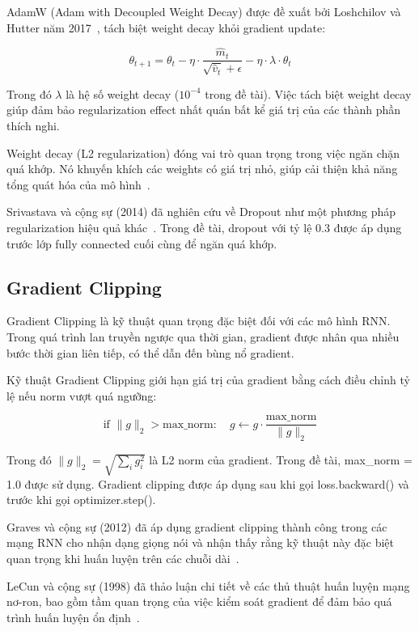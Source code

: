 \documentclass[../BTL.tex]{subfiles}
\begin{document}
AdamW (Adam with Decoupled Weight Decay) được đề xuất bởi Loshchilov và Hutter năm 2017~\cite{loshchilov2017adamw}, tách biệt weight decay khỏi gradient update:

\begin{equation}
    \theta_{t+1} = \theta_t - \eta \cdot \frac{\hat{m}_t}{\sqrt{\hat{v}_t} + \epsilon} - \eta \cdot \lambda \cdot \theta_t
\end{equation}

Trong đó $\lambda$ là hệ số weight decay ($10^{-4}$ trong đề tài). Việc tách biệt weight decay giúp đảm bảo regularization effect nhất quán bất kể giá trị của các thành phần thích nghi.

Weight decay (L2 regularization) đóng vai trò quan trọng trong việc ngăn chặn quá khớp. Nó khuyến khích các weights có giá trị nhỏ, giúp cải thiện khả năng tổng quát hóa của mô hình~\cite{goodfellow2016deep}.

Srivastava và cộng sự (2014) đã nghiên cứu về Dropout như một phương pháp regularization hiệu quả khác~\cite{srivastava2014dropout}. Trong đề tài, dropout với tỷ lệ 0.3 được áp dụng trước lớp fully connected cuối cùng để ngăn quá khớp.

\subsection{Gradient Clipping}
Gradient Clipping là kỹ thuật quan trọng đặc biệt đối với các mô hình RNN. Trong quá trình lan truyền ngược qua thời gian, gradient được nhân qua nhiều bước thời gian liên tiếp, có thể dẫn đến bùng nổ gradient.

Kỹ thuật Gradient Clipping giới hạn giá trị của gradient bằng cách điều chỉnh tỷ lệ nếu norm vượt quá ngưỡng:

\begin{equation}
    \text{if } \|g\|_2 > \text{max\_norm}: \quad g \leftarrow g \cdot \frac{\text{max\_norm}}{\|g\|_2}
\end{equation}

Trong đó $\|g\|_2 = \sqrt{\sum_i g_i^2}$ là L2 norm của gradient. Trong đề tài, max\_norm = 1.0 được sử dụng. Gradient clipping được áp dụng sau khi gọi loss.backward() và trước khi gọi optimizer.step().

Graves và cộng sự (2012) đã áp dụng gradient clipping thành công trong các mạng RNN cho nhận dạng giọng nói và nhận thấy rằng kỹ thuật này đặc biệt quan trọng khi huấn luyện trên các chuỗi dài~\cite{graves2012supervised}.

LeCun và cộng sự (1998) đã thảo luận chi tiết về các thủ thuật huấn luyện mạng nơ-ron, bao gồm tầm quan trọng của việc kiểm soát gradient để đảm bảo quá trình huấn luyện ổn định~\cite{lecun1998gradient}.
\end{document}
